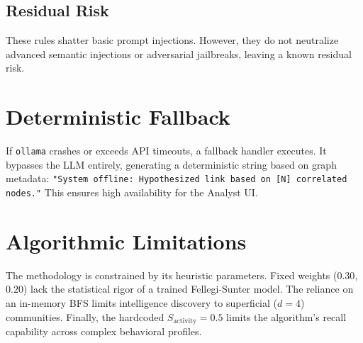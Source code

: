 \subsection{Residual Risk}
These rules shatter basic prompt injections. However, they do not neutralize advanced semantic injections 
or adversarial jailbreaks, leaving a known residual risk.

\section{Deterministic Fallback}
\label{sec:meth-fallback}
If \texttt{ollama} crashes or exceeds API timeouts, a fallback handler executes. It bypasses the LLM 
entirely, generating a deterministic string based on graph metadata: \texttt{"System offline: Hypothesized 
link based on [N] correlated nodes."} This ensures high availability for the Analyst UI.

\section{Algorithmic Limitations}
\label{sec:meth-limitations}
The methodology is constrained by its heuristic parameters. Fixed weights ($0.30$, $0.20$) lack the 
statistical rigor of a trained Fellegi-Sunter model. The reliance on an in-memory BFS limits 
intelligence discovery to superficial ($d=4$) communities. Finally, the hardcoded 
$S_{\text{activity}} = 0.5$ limits the algorithm's recall capability across complex behavioral profiles.
